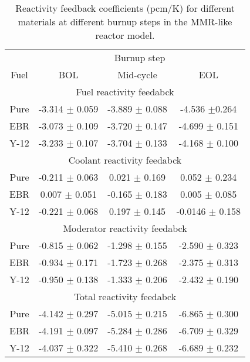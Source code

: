 \begin{table}
        \centering 
        \caption{Reactivity feedback coefficients (pcm/K) for different 
        materials at different burnup steps in the \gls{MMR}-like 
        reactor model.}
        \label{tab:coeff_mmr}
        \begin{tabular}{c c c c}
                \hline 
                & \multicolumn{3}{c}{Burnup step} \\
                Fuel & \gls{BOL} & Mid-cycle & \gls{EOL} \\
                \hline 
                \multicolumn{4}{c}{Fuel reactivity feedabck}\\
                Pure & -3.314 $\pm$ 0.059 & -3.889 $\pm$ 0.088 & -4.536 $\pm$0.264\\
                \gls{EBR} & -3.073 $\pm$ 0.109 & -3.720 $\pm$ 0.147 & -4.699 $\pm$ 0.151\\
                Y-12 & -3.233 $\pm$ 0.107 & -3.704 $\pm$ 0.133 & -4.168 $\pm$ 0.100\\
                \hline 
                \multicolumn{4}{c}{Coolant reactivity feedabck}\\
                Pure & -0.211 $\pm$ 0.063 & 0.021 $\pm$ 0.169 & 0.052 $\pm$ 0.234\\
                \gls{EBR} & 0.007 $\pm$ 0.051 & -0.165 $\pm$ 0.183 & 0.005 $\pm$ 0.085\\
                Y-12 & -0.221 $\pm$ 0.068 & 0.197 $\pm$ 0.145 & -0.0146 $\pm$ 0.158\\
                \hline 
                \multicolumn{4}{c}{Moderator reactivity feedabck}\\
                Pure & -0.815 $\pm$ 0.062 & -1.298 $\pm$ 0.155 & -2.590 $\pm$ 0.323\\
                \gls{EBR} &-0.934 $\pm$ 0.171 & -1.723 $\pm$ 0.268 & -2.375 $\pm$ 0.313\\
                Y-12 & -0.950 $\pm$ 0.138 & -1.333 $\pm$ 0.206 & -2.432 $\pm$ 0.190\\
                \hline 
                \multicolumn{4}{c}{Total reactivity feedabck}\\
                Pure & -4.142 $\pm$ 0.297 & -5.015 $\pm$ 0.215 & -6.865 $\pm$ 0.300\\
                \gls{EBR} & -4.191 $\pm$ 0.097 & -5.284 $\pm$ 0.286 & -6.709 $\pm$ 0.329\\
                Y-12 & -4.037 $\pm$ 0.322 & -5.410 $\pm$ 0.268 & -6.689 $\pm$ 0.232\\
                \hline 
                
                
        \end{tabular}
\end{table}